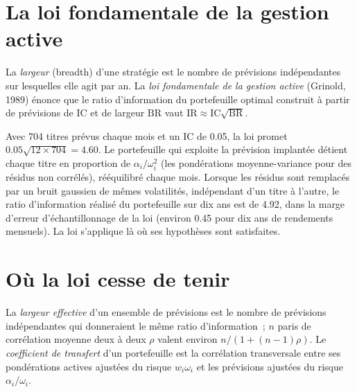 \section{La loi fondamentale de la gestion active}

\begin{definition}\label{def:rs:from-signal-to-forecast:law}
La \emph{largeur} (breadth) d'une stratégie est le nombre de prévisions indépendantes sur lesquelles elle agit par an. La \emph{loi fondamentale de la
gestion active} (Grinold, 1989) énonce que le ratio d'information du portefeuille optimal construit à partir de
prévisions de  $\mathrm{IC}$ et de largeur $\mathrm{BR}$ vaut $\mathrm{IR} \approx \mathrm{IC}\sqrt{\mathrm{BR}}$.
\end{definition}

Avec 704 titres prévus chaque mois et un IC de 0.05, la loi promet $0.05\sqrt{12 \times 704} = 4.60$. Le portefeuille qui exploite la prévision implantée
détient chaque titre en proportion de $\alpha_i/\omega_i^2$ (les pondérations moyenne-variance pour des résidus non corrélés), rééquilibré chaque mois. Lorsque
les résidus sont remplacés par un bruit gaussien de mêmes volatilités, indépendant d'un titre à l'autre, le ratio d'information réalisé du portefeuille sur dix
ans est de 4.92, dans la marge d'erreur d'échantillonnage de la loi (environ 0.45 pour dix ans de rendements mensuels). La loi s'applique là où ses hypothèses sont satisfaites.

\section{Où la loi cesse de tenir}

\begin{definition}\label{def:rs:from-signal-to-forecast:breadth}
La \emph{largeur effective} d'un ensemble de prévisions est le nombre de prévisions indépendantes qui donneraient le même
ratio d'information~; $n$ paris de corrélation moyenne deux à deux $\rho$ valent environ $n/(1 + (n - 1)\rho)$. Le \emph{coefficient de
transfert} d'un portefeuille est la corrélation transversale entre ses pondérations actives ajustées du risque $w_i\omega_i$
et les prévisions ajustées du risque $\alpha_i/\omega_i$.
\end{definition}

